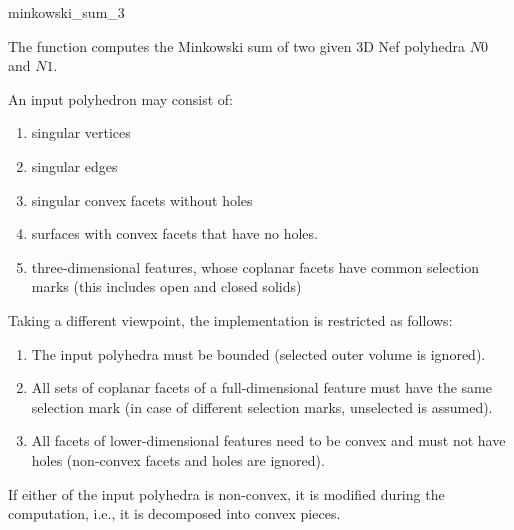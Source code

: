 
\ccHtmlNoClassLinks
\begin{ccRefFunction}{minkowski_sum_3}
\label{refminkowski_sum_3}

\ccDefinition

The function  computes the Minkowski sum of two
given 3D Nef polyhedra $N0$ and $N1$.


\ccPrecond

An input polyhedron may consist of:
\begin{enumerate}
\item singular vertices
\item singular edges
\item singular convex facets without holes
\item surfaces with convex facets that have no holes.
\item three-dimensional features, whose coplanar facets have
common selection marks (this includes open and closed solids)
\end{enumerate}

Taking a different viewpoint, the implementation is restricted as
follows:
\begin{enumerate}
\item The input polyhedra must be bounded (selected outer volume is ignored).
\item All sets of coplanar facets of a full-dimensional
feature must have the same selection mark (in case of different
selection marks, unselected is assumed).
\item All facets of lower-dimensional features need to be convex and 
must not have holes (non-convex facets and holes are ignored).
\end{enumerate}

\ccPostcond

If either of the input polyhedra is non-convex, it is modified during
the computation, i.e., it is decomposed into convex pieces.

\ccSeeAlso
{}\\ 
\\ 

\end{ccRefFunction}
